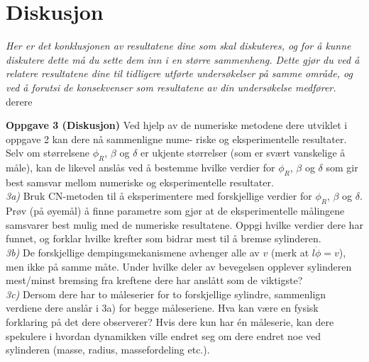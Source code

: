 \documentclass[5p]{elsarticle}
\begin{document}


\section{Diskusjon}
\textit{Her er det konklusjonen av resultatene dine som skal diskuteres, og
for å kunne diskutere dette må du sette dem inn i en større
sammenheng. Dette gjør du ved å relatere resultatene dine til
tidligere utførte undersøkelser på samme område, og ved å forutsi de
konsekvenser som resultatene av din undersøkelse medfører.}
derere

\textbf{Oppgave 3 (Diskusjon)}
Ved hjelp av de numeriske metodene dere utviklet i oppgave 2 kan dere nå sammenligne nume-
riske og eksperimentelle resultater. Selv om størrelsene \(\phi_R\), \(\beta\) og \(\delta\) er ukjente størrelser (som er
svært vanskelige å måle), kan de likevel anslås ved å bestemme hvilke verdier for \(\phi_R\), \(\beta\) og \(\delta\) som
gir best samsvar mellom numeriske og eksperimentelle resultater.
\\\textit{3a)} Bruk CN-metoden til å eksperimentere med forskjellige verdier for \(\phi_R\), \(\beta\) og \(\delta\). Prøv (på
øyemål) å finne parametre som gjør at de eksperimentelle målingene samsvarer best mulig med
de numeriske resultatene. Oppgi hvilke verdier dere har funnet, og forklar hvilke krefter som
bidrar mest til å bremse sylinderen.
\\\textit{3b)} De forskjellige dempingsmekanismene avhenger alle av \(v\) (merk at \(l\dot{\phi} = v\)), men ikke på
samme måte. Under hvilke deler av bevegelsen opplever sylinderen mest/minst bremsing fra
kreftene dere har anslått som de viktigste?
\\\textit{3c)} Dersom dere har to måleserier for to forskjellige sylindre, sammenlign verdiene dere anslår
i 3a) for begge måleseriene. Hva kan være en fysisk forklaring på det dere observerer? Hvis dere
kun har én måleserie, kan dere spekulere i hvordan dynamikken ville endret seg om dere endret
noe ved sylinderen (masse, radius, massefordeling etc.).
\end{document}
